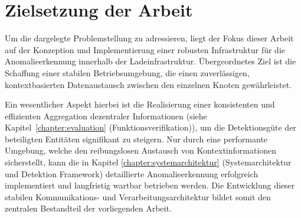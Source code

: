 \section{Zielsetzung der Arbeit}
	Um die dargelegte Problemstellung zu adressieren, liegt der Fokus dieser Arbeit auf der Konzeption und Implementierung einer robusten Infrastruktur für die Anomalieerkennung innerhalb der Ladeinfrastruktur. Übergeordnetes Ziel ist die Schaffung einer stabilen Betriebsumgebung, die einen zuverlässigen, kontextbasierten Datenaustausch zwischen den einzelnen Knoten gewährleistet. 

	Ein wesentlicher Aspekt hierbei ist die Realisierung einer konsistenten und effizienten Aggregation dezentraler Informationen (siehe Kapitel~\ref{chapter:evaluation} (Funktionsverifikation)), um die Detektionsgüte der beteiligten Entitäten signifikant zu steigern. Nur durch eine performante Umgebung, welche den reibungslosen Austausch von Kontextinformationen sicherstellt, kann die in Kapitel \ref{chapter:systemarchitektur} (Systemarchitektur und Detektion Framework) detaillierte Anomalieerkennung erfolgreich implementiert und langfristig wartbar betrieben werden. Die Entwicklung dieser stabilen Kommunikations- und Verarbeitungsarchitektur bildet somit den zentralen Bestandteil der vorliegenden Arbeit.